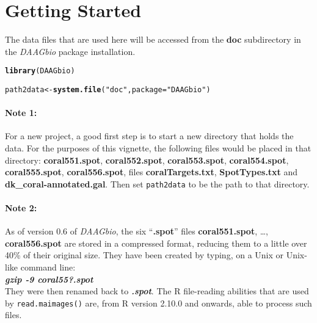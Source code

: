 \documentclass[a4paper,9pt]{article}\usepackage[]{graphicx}\usepackage[]{color}
\makeatletter
\newcommand{\hlstr}[1]{\textcolor[rgb]{0.192,0.494,0.8}{#1}}%
\newcommand{\hlstd}[1]{\textcolor[rgb]{0.345,0.345,0.345}{#1}}%
\newcommand{\hlkwb}[1]{\textcolor[rgb]{0.69,0.353,0.396}{#1}}%
\newcommand{\hlkwc}[1]{\textcolor[rgb]{0.333,0.667,0.333}{#1}}%
\newcommand{\hlkwd}[1]{\textcolor[rgb]{0.737,0.353,0.396}{\textbf{#1}}}%
\newenvironment{kframe}{%
 \def\at@end@of@kframe{}%
 \ifinner\ifhmode%
  \def\at@end@of@kframe{\end{minipage}}%
  \begin{minipage}{\columnwidth}%
 \fi\fi%
 \def\FrameCommand##1{\hskip\@totalleftmargin \hskip-\fboxsep
 \colorbox{shadecolor}{##1}\hskip-\fboxsep
     \hskip-\linewidth \hskip-\@totalleftmargin \hskip\columnwidth}%
 \MakeFramed {\advance\hsize-\width
   \@totalleftmargin\z@ \linewidth\hsize
   \@setminipage}}%
 {\par\unskip\endMakeFramed%
 \at@end@of@kframe}
\newenvironment{knitrout}{}{} %
\makeatother
\begin{document}
\section{Getting Started}

The data files that are used here will be accessed from the {\bf doc}
subdirectory in the {\em DAAGbio} package installation.
\begin{knitrout}
\color{fgcolor}\begin{kframe}
\begin{alltt}
\hlkwd{library}\hlstd{(DAAGbio)}
\end{alltt}


{\ttfamily\noindent\itshape\color{messagecolor}{\#\# Loading required package: limma}}\begin{alltt}
\hlstd{path2data} \hlkwb{<-} \hlkwd{system.file}\hlstd{(}\hlstr{"doc"}\hlstd{,} \hlkwc{package}\hlstd{=}\hlstr{"DAAGbio"}\hlstd{)}
\end{alltt}
\end{kframe}
\end{knitrout}

\paragraph{Note 1:} For a new project, a good first step is to start a
new directory that holds the data.  For the purposes of this vignette,
the following files would be placed in that directory:
\textbf{coral551.spot}, \textbf{coral552.spot},
\textbf{coral553.spot}, \textbf{coral554.spot},
\textbf{coral555.spot}, \textbf{coral556.spot}, files
\textbf{coralTargets.txt}, \textbf{SpotTypes.txt} and
\textbf{dk\_coral-annotated.gal}. Then set \texttt{path2data} to be
the path to that directory.

\paragraph{Note 2:} As of version 0.6 of \textit{DAAGbio}, the six
``\textbf{.spot}'' files \textbf{coral551.spot}, \ldots,
\textbf{coral556.spot} are stored in a compressed format, reducing
them to a little over 40\% of their original size. They have been
created by typing, on a Unix or Unix-like command line:\\[4pt]
\textbf{\em gzip -9 coral55?.spot}\\[4pt]
They were then renamed back to \textbf{\em *.spot}. The R file-reading
abilities that are used by \texttt{read.maimages()} are, from R
version 2.10.0 and onwards, able to process such files.
\end{document}
